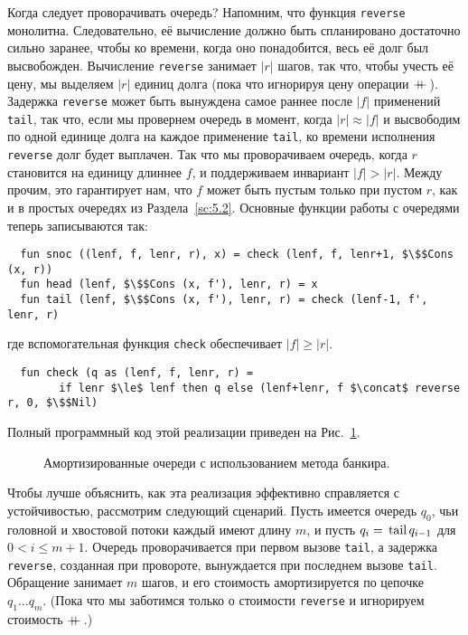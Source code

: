 Когда следует проворачивать очередь? Напомним, что функция
\lstinline!reverse! монолитна. Следовательно, её вычисление должно
быть спланировано достаточно сильно заранее, чтобы ко времени, когда
оно понадобится, весь её долг был высвобожден. Вычисление
\lstinline!reverse! занимает $|r|$ шагов, так что, чтобы учесть её
цену, мы выделяем $|r|$ единиц долга (пока что игнорируя цену
операции $+\!\!\!+\,$). Задержка \lstinline!reverse! может быть вынуждена
самое раннее после $|f|$ применений \lstinline!tail!, так что, если мы
провернем очередь в момент, когда $|r| \approx |f|$ и высвободим по
одной единице долга на каждое применение \lstinline!tail!, ко времени
исполнения \lstinline!reverse! долг будет выплачен.  Так что мы
проворачиваем очередь, когда $r$ становится на единицу длиннее $f$, и
поддерживаем инвариант $|f| > |r|$. Между прочим, это гарантирует нам,
что $f$ может быть пустым только при пустом $r$, как и в простых
очередях из Раздела~\ref{sc:5.2}. Основные функции работы с очередями
теперь записываются так:
\begin{lstlisting}
  fun snoc ((lenf, f, lenr, r), x) = check (lenf, f, lenr+1, $\$$Cons (x, r))
  fun head (lenf, $\$$Cons (x, f'), lenr, r) = x
  fun tail (lenf, $\$$Cons (x, f'), lenr, r) = check (lenf-1, f', lenr, r)
\end{lstlisting}
где вспомогательная функция \lstinline!check! обеспечивает $|f| \ge |r|$.
\begin{lstlisting}
  fun check (q as (lenf, f, lenr, r) =
        if lenr $\le$ lenf then q else (lenf+lenr, f $\concat$ reverse r, 0, $\$$Nil)
\end{lstlisting}
Полный программный код этой реализации приведен на Рис.~\ref{fig:6.1}.
\begin{figure}
  \centering

  \caption{Амортизированные очереди с использованием метода банкира.}
  \label{fig:6.1}
\end{figure}

Чтобы лучше объяснить, как эта реализация эффективно справляется с
устойчивостью, рассмотрим следующий сценарий. Пусть имеется очередь
$q_0$, чьи головной и хвостовой потоки каждый имеют длину $m$, и пусть
$q_i = \lstinline!tail! q_{i-1}$ для $0 < i \le m+1$. Очередь
проворачивается при первом вызове \lstinline!tail!, а задержка
\lstinline!reverse!, созданная при провороте, вынуждается при последнем
вызове \lstinline!tail!. Обращение занимает $m$ шагов, и его стоимость
амортизируется по цепочке $q_1\ldots q_m$. (Пока что мы заботимся
только о стоимости \lstinline!reverse! и игнорируем стоимость
$+\!\!\!+\,$.)

